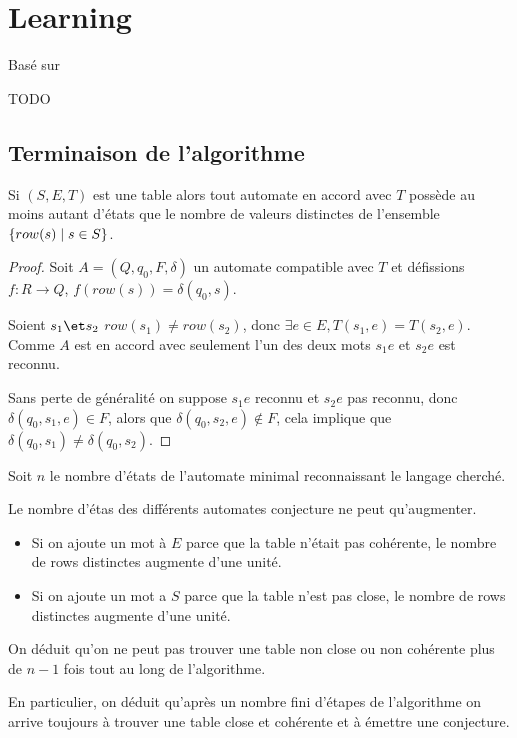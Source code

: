 \section{Learning}

Basé sur \cite{angluinLearning}



TODO




\subsection{Terminaison de l'algorithme}

\begin{lemma}
	Si $(S,E,T)$ est une table alors tout automate en accord avec $T$ possède au
	moins autant d'états que le nombre de valeurs distinctes de l'ensemble $\left\{row(s) \mid s \in S\right\}$.
\end{lemma}

\begin{proof}
	Soit $A = (Q,q_0,F,\delta)$ un automate compatible avec $T$ et défissions
	$f: R \to Q$, $f(row(s)) = \delta(q_0, s)$.

	Soient $s_1 \et s_2$ \tq $row(s_1) \neq row(s_2)$, donc $\exists e \in E, T(s_1,e) = T(s_2,e)$.
	Comme $A$ est en accord avec seulement l'un des deux mots $s_1e$ et $s_2e$ est reconnu.

	Sans perte de généralité on suppose $s_1e$ reconnu et $s_2e$ pas reconnu, donc
	$\delta (q_0, s_1, e) \in F$, alors que $\delta (q_0,s_2,e) \notin F$, cela implique que
	$\delta (q_0,s_1) \neq \delta (q_0,s_2)$.

\end{proof}

Soit $n$ le nombre d'états de l'automate minimal reconnaissant le langage cherché.

\begin{remarque}
	Le nombre d'étas des différents automates conjecture ne peut qu'augmenter.
	\begin{itemize}
		\item Si on ajoute un mot à $E$ parce que la table n'était pas cohérente, le nombre de rows distinctes augmente
		      d'une unité.
		\item Si on ajoute un mot a $S$ parce que la table n'est pas close, le nombre de rows distinctes augmente d'une unité.
	\end{itemize}
	On déduit qu'on ne peut pas trouver une table non close ou non cohérente plus de $n-1$ fois tout au long de l'algorithme.

	En particulier, on déduit qu'après un nombre fini d'étapes de l'algorithme on arrive toujours à trouver
	une table close et cohérente et à émettre une conjecture.
\end{remarque}


